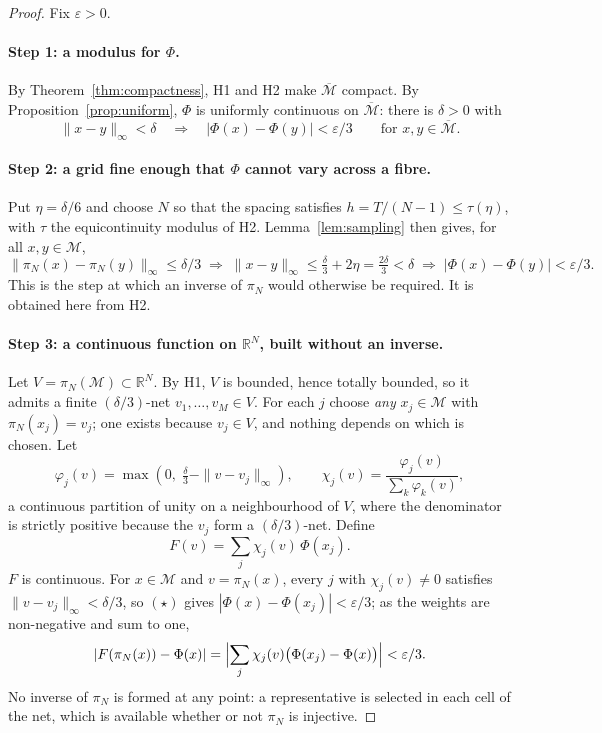 \documentclass[10pt]{article}
\theoremstyle{plain}
\theoremstyle{definition}
\theoremstyle{remark}
\begin{document}
\begin{proof}
Fix $\varepsilon > 0$.

\paragraph{Step 1: a modulus for $\Phi$.}
By Theorem~\ref{thm:compactness}, H1 and H2 make $\overline{\mathcal{M}}$
compact. By Proposition~\ref{prop:uniform}, $\Phi$ is uniformly continuous on
$\overline{\mathcal{M}}$: there is $\delta > 0$ with
\[
\|x-y\|_\infty < \delta
\quad\Longrightarrow\quad
|\Phi(x)-\Phi(y)| < \varepsilon/3
\qquad \text{for } x,y \in \overline{\mathcal{M}}.
\]

\paragraph{Step 2: a grid fine enough that $\Phi$ cannot vary across a fibre.}
Put $\eta = \delta/6$ and choose $N$ so that the spacing satisfies
$h = T/(N-1) \le \tau(\eta)$, with $\tau$ the equicontinuity modulus of H2.
Lemma~\ref{lem:sampling} then gives, for all $x,y \in \mathcal{M}$,
\[
\|\pi_N(x)-\pi_N(y)\|_\infty \le \delta/3
\;\Longrightarrow\;
\|x-y\|_\infty \le \tfrac{\delta}{3} + 2\eta = \tfrac{2\delta}{3} < \delta
\;\Longrightarrow\;
|\Phi(x)-\Phi(y)| < \varepsilon/3 .
\tag{$\star$}
\]
This is the step at which an inverse of $\pi_N$ would otherwise be required. It is obtained here from H2.

\paragraph{Step 3: a continuous function on $\mathbb{R}^N$, built without an inverse.}
Let $V = \pi_N(\mathcal{M}) \subset \mathbb{R}^N$. By H1, $V$ is bounded, hence
totally bounded, so it admits a finite $(\delta/3)$-net $v_1,\dots,v_M \in V$.
For each $j$ choose \emph{any} $x_j \in \mathcal{M}$ with $\pi_N(x_j) = v_j$;
one exists because $v_j \in V$, and nothing depends on which is chosen. Let
\[
\varphi_j(v) = \max\!\left(0,\; \tfrac{\delta}{3} - \|v - v_j\|_\infty\right),
\qquad
\chi_j(v) = \frac{\varphi_j(v)}{\sum_k \varphi_k(v)} ,
\]
a continuous partition of unity on a neighbourhood of $V$, where the
denominator is strictly positive because the $v_j$ form a $(\delta/3)$-net.
Define
\[
F(v) = \sum_j \chi_j(v)\, \Phi(x_j) .
\]
$F$ is continuous. For $x \in \mathcal{M}$ and $v = \pi_N(x)$, every $j$ with
$\chi_j(v) \neq 0$ satisfies $\|v - v_j\|_\infty < \delta/3$, so $(\star)$ gives
$|\Phi(x) - \Phi(x_j)| < \varepsilon/3$; as the weights are non-negative and sum
to one,
\[
|F(\pi_N(x)) - \Phi(x)|
= \Bigl|\sum_j \chi_j(v)\bigl(\Phi(x_j)-\Phi(x)\bigr)\Bigr|
< \varepsilon/3 .
\]
No inverse of $\pi_N$ is formed at any point: a representative is selected in
each cell of the net, which is available whether or not $\pi_N$ is injective.


\end{proof}
\end{document}
